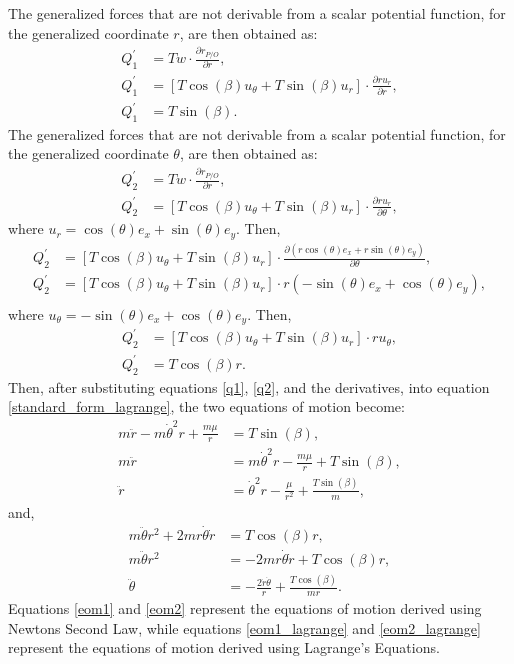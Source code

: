 \documentclass[]{article}
\begin{document}
The generalized forces that are not derivable from a scalar potential function, for the generalized coordinate \(r\), are then obtained as:
\begin{align}
	Q^{'}_{1} &= Tw \cdot  \frac{\partial r_{P/O}}{\partial r}, \nonumber\\
	Q^{'}_{1} &= [T\cos(\beta)u_{\theta} + T\sin(\beta)u_{r}] \cdot \frac{\partial ru_{r}}{\partial r}, \nonumber\\
	Q^{'}_{1} &= T\sin(\beta) \label{q1}.
\end{align}
The generalized forces that are not derivable from a scalar potential function, for the generalized coordinate \(\theta\), are then obtained as:
\begin{align*}
	Q^{'}_{2} &= Tw \cdot  \frac{\partial r_{P/O}}{\partial r}, \\
	Q^{'}_{2} &= [T\cos(\beta)u_{\theta} + T\sin(\beta)u_{r}] \cdot \frac{\partial ru_{r}}{\partial \theta},
\end{align*}
where \(u_r = \cos(\theta)e_{x} + \sin(\theta)e_{y}\). Then,
\begin{align*}
	Q^{'}_{2} &= [T\cos(\beta)u_{\theta} + T\sin(\beta)u_{r}] \cdot \frac{\partial (r\cos(\theta)e_{x} + r\sin(\theta)e_{y})}{\partial \theta}, \\
	Q^{'}_{2} &= [T\cos(\beta)u_{\theta} + T\sin(\beta)u_{r}] \cdot r(-\sin(\theta)e_{x} + \cos(\theta)e_{y}), \\
\end{align*}
where \(u_{\theta} = -\sin(\theta)e_{x} + \cos(\theta)e_{y}\). Then,
\begin{align}
	Q^{'}_{2} &= [T\cos(\beta)u_{\theta} + T\sin(\beta)u_{r}] \cdot ru_{\theta}, \nonumber\\
	Q^{'}_{2} &= T\cos(\beta)r. \label{q2}
\end{align}
Then, after substituting equations \ref{q1}, \ref{q2}, and the derivatives, into equation \ref{standard_form_lagrange}, the two equations of motion become:
\begin{align}
 m\ddot{r} - m\dot{\theta}^2r + \frac{m\mu}{r} &= T\sin(\beta), \nonumber\\
 m\ddot{r}                                     &= m\dot{\theta}^2r - \frac{m\mu}{r} + T\sin(\beta), \nonumber\\
 \ddot{r}                                      &= \dot{\theta}^2r - \frac{\mu}{r^2} + \frac{T\sin(\beta)}{m} \label{eom1_lagrange},
\end{align}
and,
\begin{align}
 m\ddot{\theta}r^2 + 2mr\dot{\theta}\dot{r}    &= T\cos(\beta)r, \nonumber\\
 m\ddot{\theta}r^2                             &= -2mr\dot{\theta}\dot{r} + T\cos(\beta)r, \nonumber\\
 \ddot{\theta}                                &= -\frac{2\dot{r}\dot{\theta}}{r}   + \frac{T\cos(\beta)}{mr} \label{eom2_lagrange}.
\end{align}
\noindent
Equations \ref{eom1} and \ref{eom2} represent the equations of motion derived using Newtons Second Law, while equations \ref{eom1_lagrange} and \ref{eom2_lagrange} represent the equations of motion derived using Lagrange's Equations. 
\end{document}
